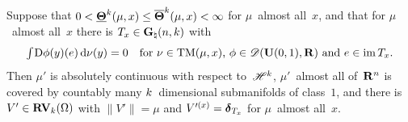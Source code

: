 \documentclass[a4paper,twoside,leqno]{article}
\newcommand{\Gk}{\pgrass{\adim}{\vdim}}        %
\DeclareMathOperator{\TM}{TM}                   %
\begin{document}
\begin{lemma}
    \label{ddg:2.2}
    Suppose that $0 < \boldsymbol{\underline{\Theta}}^{k}(\mu,x) \le \boldsymbol{\overline{\Theta}}^{k}(\mu,x) < \infty$ for
    $\mu$~almost all~$x$, and that for $\mu$~almost all~$x$ there is $T_x \in \Gk$ with
    \begin{displaymath}
        \textint{}{} \uD \phi(y)(e) \ud \nu(y) = 0 \quad \text{for $\nu \in \TM(\mu,x)$, $\phi \in
        \dspace{\oball{0}{1}}{\R}$ and $e \in \im T_x$}.
    \end{displaymath}
    Then $\mu'$ is absolutely continuous with respect to~$\mathscr{H}^{k}$, $\mu'$~almost all
    of~$\mathbf{R}^{n}$ is covered by countably many $k$~dimensional submanifolds of class~$1$,
    and there is $V' \in \mathbf{RV}_{k}(\Omega)$ with $\|V'\| = \mu$ and $V'^{(x)} = \boldsymbol{\delta}_{T_x}$ for
    $\mu$~almost all~$x$.
\end{lemma}
\end{document}
